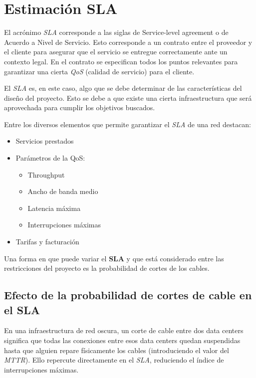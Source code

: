 \section{Estimación SLA}
\label{sec:SLA}

El acrónimo \emph{SLA} corresponde a las siglas de Service-level
agreement o de Acuerdo a Nivel de Servicio. Esto corresponde a un
contrato entre el proveedor y el cliente para asegurar que el servicio
se entregue correctamente ante un contexto legal. En el contrato se
especifican todos los puntos relevantes para garantizar una cierta
\emph{QoS} (calidad de servicio) para el cliente.

El \emph{SLA} es, en este caso, algo que se debe determinar de las
características del diseño del proyecto. Esto se debe a que existe una
cierta infraestructura que será aprovechada para cumplir los objetivos
buscados.

Entre los diversos elementos que permite garantizar el \emph{SLA} de
una red destacan:
\begin{itemize}
\item Servicios prestados
\item Parámetros de la QoS:
  \begin{itemize}
  \item Throughput
  \item Ancho de banda medio
  \item Latencia máxima
  \item Interrupciones máximas
  \end{itemize}
\item Tarifas y facturación
\end{itemize}

Una forma en que puede variar el \textbf{SLA} y que está considerado
entre las restricciones del proyecto es la probabilidad de cortes de
los cables.

\subsection{Efecto de la probabilidad de cortes de cable en el SLA}
\label{sec:cortes}

En una infraestructura de red oscura, un corte de cable entre dos data
centers significa que todas las conexiones entre esos data centers
quedan suspendidas hasta que alguien repare físicamente los cables
(introduciendo el valor del \emph{MTTR}). Ello repercute directamente
en el \emph{SLA}, reduciendo el índice de interrupciones máximas.

